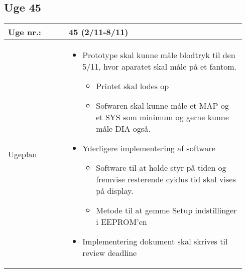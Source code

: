 	\subsection{Uge 45} \label{app:logUge45}
	\begin{longtable}{|p{0.24\linewidth}|p{0.7\linewidth}|}
		\hline
		Uge nr.: & 45 (2/11-8/11)\\ \hline
		Ugeplan & 
		\begin{itemize}
			\item Prototype skal kunne måle blodtryk til den 5/11, hvor aparatet skal måle på et fantom.
			\begin{itemize}
				\item Printet skal lodes op
				\item Sofwaren skal kunne måle et MAP og et SYS som minimum og gerne kunne måle DIA også.
			\end{itemize}
			\item Yderligere implementering af software
			\begin{itemize}
				\item Software til at holde styr på tiden og fremvise resterende cyklus tid skal vises på display.
				\item Metode til at gemme Setup indstillinger i EEPROM’en
			\end{itemize}
			\item Implementering dokument skal skrives til review deadline
		\end{itemize}
		

\end{longtable}
